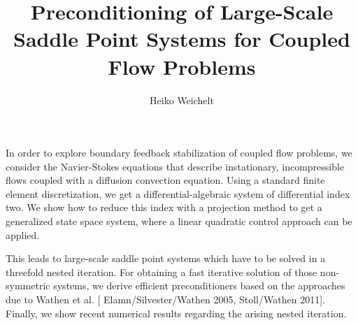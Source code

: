 \documentclass{article}
\title{Preconditioning of Large-Scale Saddle Point Systems
  for Coupled Flow Problems}
\author{Heiko Weichelt}
\affil{PhD student at Max Planck Institute for Dynamics of Complex
    Technical Systems Magdeburg, Germany}
\date{}
\begin{document}
\maketitle
\setcounter{page}{8}
In order to explore boundary feedback stabilization of coupled flow
problems, we consider the Navier-Stokes equations that describe
instationary, incompressible flows coupled with a diffusion convection
equation. Using a standard finite element discretization, we get a
differential-algebraic system of differential index two. We show how
to reduce this index with a projection method to get a generalized
state space system, where a linear quadratic control approach can be
applied.

This leads to large-scale saddle point systems which have to be solved
in a threefold nested iteration. For obtaining a fast iterative
solution of those non-symmetric systems, we derive efficient
preconditioners based on the approaches due to Wathen et al. [{\sc
  Elamn/Silvester/Wathen 2005, Stoll/Wathen 2011}]. Finally, we show
recent numerical results regarding the arising nested iteration.
\end{document}
